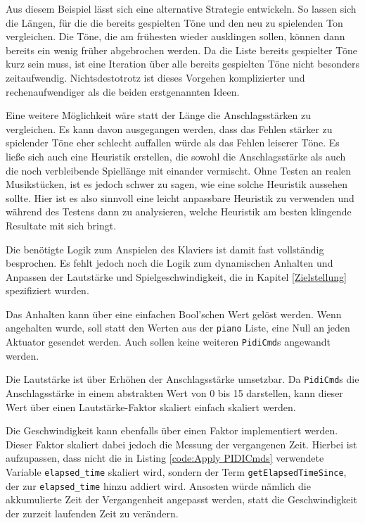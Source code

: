 Aus diesem Beispiel lässt sich eine alternative Strategie entwickeln.
So lassen sich die Längen, für die die bereits gespielten Töne und den neu zu spielenden Ton vergleichen.
Die Töne, die am frühesten wieder ausklingen sollen, können dann bereits ein wenig früher abgebrochen werden.
Da die Liste bereits gespielter Töne kurz sein muss, ist eine Iteration über alle bereits gespielten Töne nicht besonders zeitaufwendig.
Nichtsdestotrotz ist dieses Vorgehen komplizierter und rechenaufwendiger als die beiden erstgenannten Ideen.

Eine weitere Möglichkeit wäre statt der Länge die Anschlagsstärken zu vergleichen.
Es kann davon ausgegangen werden, dass das Fehlen stärker zu spielender Töne eher schlecht auffallen würde als das Fehlen leiserer Töne.
Es ließe sich auch eine Heuristik erstellen, die sowohl die Anschlagsstärke als auch die noch verbleibende Spiellänge mit einander vermischt.
Ohne Testen an realen Musikstücken, ist es jedoch schwer zu sagen, wie eine solche Heuristik aussehen sollte.
Hier ist es also sinnvoll eine leicht anpassbare Heuristik zu verwenden und während des Testens dann zu analysieren, welche Heuristik am besten klingende Resultate mit sich bringt.

Die benötigte Logik zum Anspielen des Klaviers ist damit fast vollständig besprochen.
Es fehlt jedoch noch die Logik zum dynamischen Anhalten und Anpassen der Lautstärke und Spielgeschwindigkeit, die in Kapitel \ref{Zielstellung} spezifiziert wurden.

Das Anhalten kann über eine einfachen Bool'schen Wert gelöst werden.
Wenn angehalten wurde, soll statt den Werten aus der \lstinline{piano} Liste, eine Null an jeden Aktuator gesendet werden.
Auch sollen keine weiteren \lstinline{PidiCmd}s angewandt werden.

Die Lautstärke ist über Erhöhen der Anschlagsstärke umsetzbar.
Da \lstinline{PidiCmd}s die Anschlagsstärke in einem abstrakten Wert von 0 bis 15 darstellen, kann dieser Wert über einen Lautstärke-Faktor skaliert einfach skaliert werden.

Die Geschwindigkeit kann ebenfalls über einen Faktor implementiert werden.
Dieser Faktor skaliert dabei jedoch die Messung der vergangenen Zeit.
Hierbei ist aufzupassen, dass nicht die in Listing \ref{code:Apply PIDICmds} verwendete Variable \lstinline{elapsed_time} skaliert wird, sondern der Term \lstinline{getElapsedTimeSince}, der zur \lstinline{elapsed_time} hinzu addiert wird.
Ansosten würde nämlich die akkumulierte Zeit der Vergangenheit angepasst werden, statt die Geschwindigkeit der zurzeit laufenden Zeit zu verändern.


